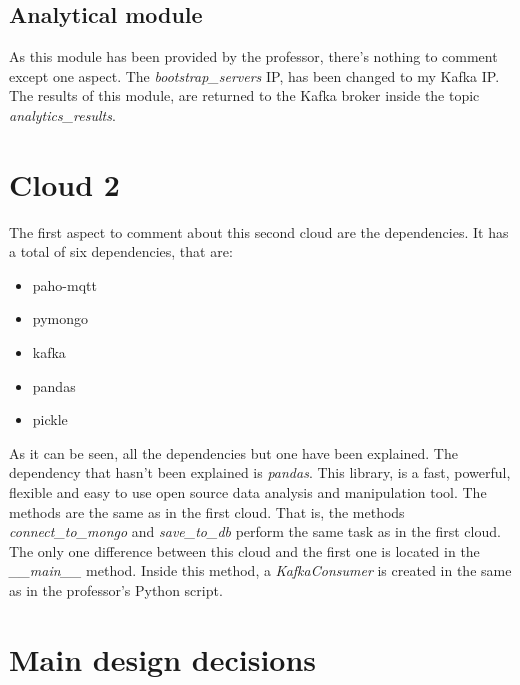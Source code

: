 \documentclass[a4paper,12pt]{article}
\begin{document}
\subsection*{Analytical module}
As this module has been provided by the professor, there's nothing to comment except one aspect. The \textit{bootstrap\_servers} IP, has been changed to my Kafka IP.\\
The results of this module, are returned to the Kafka broker inside the topic \textit{analytics\_results}.

\section*{Cloud 2}
The first aspect to comment about this second cloud are the dependencies. It has a total of six dependencies, that are:
\begin{itemize}
    \item paho-mqtt
    \item pymongo
    \item kafka
    \item pandas
    \item pickle
\end{itemize}
As it can be seen, all the dependencies but one have been explained. The dependency that hasn't been explained is \textit{pandas}. This library, is a fast, powerful, flexible and easy to use open source data analysis and manipulation tool.
The methods are the same as in the first cloud. That is, the methods \textit{connect\_to\_mongo} and \textit{save\_to\_db} perform the same task as in the first cloud.\\
The only one difference between this cloud and the first one is located in the \textit{\_\_main\_\_} method. Inside this method, a \textit{KafkaConsumer} is created in the same as in the professor's Python script.

\section*{Main design decisions}
\end{document}
